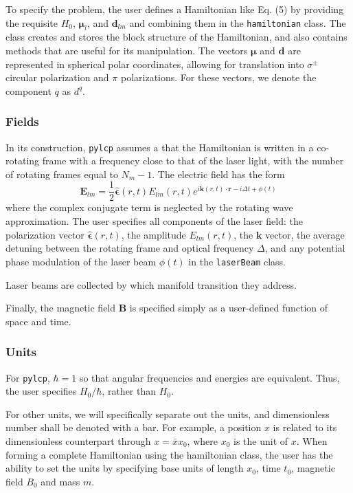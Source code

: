 \documentclass[final,5p,times,twocolumn]{elsarticle}
\begin{document}
To specify the problem, the user defines a Hamiltonian like Eq. (5) by providing the requisite $H_0$, $\boldsymbol{\mu}_l$, and $\boldsymbol{d}_{lm}$ and combining them in the {\tt hamiltonian} class.  The class creates and stores the block structure of the Hamiltonian, and also contains methods that are useful for its manipulation.  The vectors $\boldsymbol{\mu}$ and $\boldsymbol{d}$ are represented in spherical polar coordinates, allowing for translation into $\sigma^{\pm}$ circular polarization and $\pi$ polarizations.  For these vectors, we denote the component $q$ as $d^q$.

\subsubsection{Fields}
In its construction, {\tt pylcp} assumes a that the Hamiltonian is written in a co-rotating frame with a frequency close to that of the laser light, with the number of rotating frames equal to $N_m-1$.  The electric field has the form
\begin{equation}
	\mathbf{E}_{lm} = \frac{1}{2}\hat{\boldsymbol{\epsilon}}(r, t) E_{lm}(r, t)e^{i\mathbf{k}(r,t)\cdot\mathbf{r}-i \Delta t + \phi(t)}
\end{equation}
where the complex conjugate term is neglected by the rotating wave approximation.  
The user specifies all components of the laser field: the polarization vector $\hat{\boldsymbol{\epsilon}}(r, t)$, the amplitude $E_{lm}(r, t)$, the $\mathbf{k}$ vector, the average detuning between the rotating frame and optical frequency $\Delta$,  and any potential phase modulation of the laser beam $\phi(t)$ in the {\tt laserBeam} class.

Laser beams are collected by which manifold transition they address.

Finally, the magnetic field $\mathbf{B}$ is specified simply as a user-defined function  of space and time.

\subsubsection{Units}
\label{sec:obe_units}
For {\tt pylcp}, $\hbar=1$ so that angular frequencies and energies are equivalent. Thus, the user specifies $H_0/\hbar$, rather than $H_0$.

For other units, we will specifically separate out the units, and dimensionless number shall be denoted with a bar.
For example, a position $x$ is related to its dimensionless counterpart through $x = \bar{x}x_0$, where $x_0$ is the unit of $x$.
When forming a complete Hamiltonian using the hamiltonian class, the user has the ability to set the units by specifying base units of length $x_0$, time $t_0$, magnetic field $B_0$ and mass $m$.  
\end{document}
